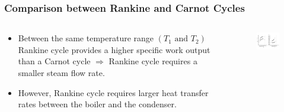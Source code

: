 \documentclass[10pt,compress,handout,ignorenonframetext]{beamer}
\begin{document}
\begin{frame}
 \frametitle{Comparison between Rankine and Carnot Cycles}
  \begin{columns}
   \begin{column}[c]{0.4\linewidth}
    \begin{itemize}
     \item <1-> Between the same temperature range $\left(T_{1}\text{ and }T_{2}\right)$ Rankine cycle provides a higher specific work output than a Carnot cycle $\Longrightarrow$ Rankine cycle requires a smaller steam flow rate. 
     \item <2-> However, Rankine cycle requires larger heat transfer rates between the boiler and the condenser.
    \end{itemize}
   \end{column}
   \begin{column}[c]{0.6\linewidth}
    \begin{figure}%
     \begin{center}
      \includegraphics[width=7.5cm,clip]{./Pics/Comparison_Rankine_Carnot}
     \end{center}
    \end{figure}  
   \end{column}
  \end{columns}
 \normalsize
\end{frame}
\end{document}
